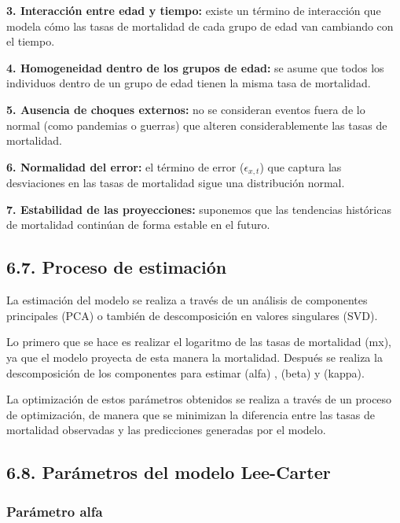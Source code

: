 \documentclass[
]{article}
\begin{document}
\textbf{3. Interacción entre edad y tiempo:} existe un término de
interacción que modela cómo las tasas de mortalidad de cada grupo de
edad van cambiando con el tiempo.

\textbf{4. Homogeneidad dentro de los grupos de edad:} se asume que
todos los individuos dentro de un grupo de edad tienen la misma tasa de
mortalidad.

\textbf{5. Ausencia de choques externos:} no se consideran eventos fuera
de lo normal (como pandemias o guerras) que alteren considerablemente
las tasas de mortalidad.

\textbf{6. Normalidad del error:} el término de error
(\(\epsilon_{x,t}\)) que captura las desviaciones en las tasas de
mortalidad sigue una distribución normal.

\textbf{7. Estabilidad de las proyecciones:} suponemos que las
tendencias históricas de mortalidad continúan de forma estable en el
futuro.

\clearpage

\hypertarget{proceso-de-estimaciuxf3n}{%
\subsection{6.7. Proceso de estimación}\label{proceso-de-estimaciuxf3n}}

La estimación del modelo se realiza a través de un análisis de
componentes principales (PCA) o también de descomposición en valores
singulares (SVD).

Lo primero que se hace es realizar el logaritmo de las tasas de
mortalidad (mx), ya que el modelo proyecta de esta manera la mortalidad.
Después se realiza la descomposición de los componentes para estimar
(alfa) , (beta) y (kappa).

La optimización de estos parámetros obtenidos se realiza a través de un
proceso de optimización, de manera que se minimizan la diferencia entre
las tasas de mortalidad observadas y las predicciones generadas por el
modelo.

\hypertarget{paruxe1metros-del-modelo-lee-carter}{%
\subsection{6.8. Parámetros del modelo
Lee-Carter}\label{paruxe1metros-del-modelo-lee-carter}}

\hypertarget{paruxe1metro-alfa}{%
\subsubsection{Parámetro alfa}\label{paruxe1metro-alfa}}
\end{document}
